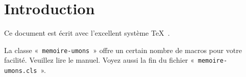 \chapter{Introduction}

Ce document est écrit avec l'excellent système \TeX\
\autocite{knuth_texbook_1986}.

La classe «~\texttt{memoire-umons}~» offre un certain nombre de macros
pour votre facilité.  Veuillez lire le manuel.  Voyez aussi la fin du
fichier «~\texttt{memoire-\linebreak[2]umons.cls}~».



